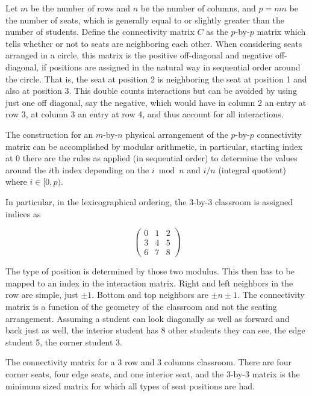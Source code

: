 \documentclass{article}
\begin{document}
Let $m$ be the number of rows and $n$ be the number of columns, and $p = mn$ be the number of seats, which is generally equal to or slightly greater than the number of students. Define the connectivity matrix $C$ as the $p$-by-$p$ matrix which tells whether or not to seats are neighboring each other. When considering seats arranged in a circle, this matrix is the positive off-diagonal and negative off-diagonal, if positions are assigned in the natural way in sequential order around the circle. That is, the seat at position 2 is neighboring the seat at position 1 and also at position 3. This double counts interactions but can be avoided by using just one off diagonal, say the negative, which would have in column 2 an entry at row 3, at column 3 an entry at row 4, and thus account for all interactions.

The construction for an $m$-by-$n$ physical arrangement of the $p$-by-$p$ connectivity matrix can be accomplished by modular arithmetic, in particular, starting index at $0$ there are the rules as applied (in sequential order) to determine the values around the $i$th index depending on the $i \bmod n$ and $i/n$ (integral quotient) where $i \in [0, p)$.

In particular, in the lexicographical ordering, the 3-by-3 classroom is assigned indices as

$$\begin{pmatrix} 
0 & 1 & 2 \\ 
3 & 4 & 5 \\ 
6 & 7 & 8 
\end{pmatrix}$$

The type of position is determined by those two modulus. This then has to be mapped to an index in the interaction matrix. Right and left neighbors in the row are simple, just $\pm 1$. Bottom and top neighbors are $\pm n \pm 1$.
The connectivity matrix is a function of the geometry of the classroom and not the seating arrangement. Assuming a student can look diagonally as well as forward and back just as well, the interior student has 8 other students they can see, the edge student 5, the corner student 3.


\begin{table}[!h]
    \caption{The connectivity matrix for a 3 row and 3 columns classroom. There are four corner seats, four edge seats, and one interior seat, and the 3-by-3 matrix is the minimum sized matrix for which all types of seat positions are had.}
\centering

\end{table}
\end{document}
